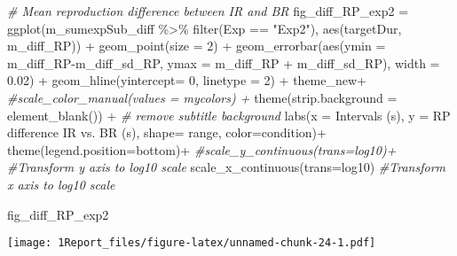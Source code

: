 \documentclass[
]{article}
\newenvironment{Shaded}{\begin{snugshade}}{\end{snugshade}}
\newcommand{\AttributeTok}[1]{\textcolor[rgb]{0.77,0.63,0.00}{#1}}
\newcommand{\CommentTok}[1]{\textcolor[rgb]{0.56,0.35,0.01}{\textit{#1}}}
\newcommand{\DecValTok}[1]{\textcolor[rgb]{0.00,0.00,0.81}{#1}}
\newcommand{\FloatTok}[1]{\textcolor[rgb]{0.00,0.00,0.81}{#1}}
\newcommand{\FunctionTok}[1]{\textcolor[rgb]{0.00,0.00,0.00}{#1}}
\newcommand{\NormalTok}[1]{#1}
\newcommand{\OtherTok}[1]{\textcolor[rgb]{0.56,0.35,0.01}{#1}}
\newcommand{\SpecialCharTok}[1]{\textcolor[rgb]{0.00,0.00,0.00}{#1}}
\newcommand{\StringTok}[1]{\textcolor[rgb]{0.31,0.60,0.02}{#1}}
\begin{document}
\begin{Shaded}
\begin{Highlighting}[]
\CommentTok{\# Mean reproduction difference between IR and BR}
\NormalTok{fig\_diff\_RP\_exp2 }\OtherTok{=} \FunctionTok{ggplot}\NormalTok{(m\_sumexpSub\_diff }\SpecialCharTok{\%\textgreater{}\%} \FunctionTok{filter}\NormalTok{(Exp }\SpecialCharTok{==} \StringTok{"Exp2"}\NormalTok{), }\FunctionTok{aes}\NormalTok{(targetDur, m\_diff\_RP)) }\SpecialCharTok{+} 
  \FunctionTok{geom\_point}\NormalTok{(}\AttributeTok{size =} \DecValTok{2}\NormalTok{) }\SpecialCharTok{+}
  \FunctionTok{geom\_errorbar}\NormalTok{(}\FunctionTok{aes}\NormalTok{(}\AttributeTok{ymin =}\NormalTok{ m\_diff\_RP}\SpecialCharTok{{-}}\NormalTok{m\_diff\_sd\_RP, }\AttributeTok{ymax =}\NormalTok{ m\_diff\_RP }\SpecialCharTok{+}\NormalTok{ m\_diff\_sd\_RP), }\AttributeTok{width =} \FloatTok{0.02}\NormalTok{) }\SpecialCharTok{+}
  \FunctionTok{geom\_hline}\NormalTok{(}\AttributeTok{yintercept=} \DecValTok{0}\NormalTok{, }\AttributeTok{linetype =} \DecValTok{2}\NormalTok{) }\SpecialCharTok{+}
\NormalTok{  theme\_new}\SpecialCharTok{+} \CommentTok{\#scale\_color\_manual(values = mycolors) +}
  \FunctionTok{theme}\NormalTok{(}\AttributeTok{strip.background =} \FunctionTok{element\_blank}\NormalTok{()) }\SpecialCharTok{+} \CommentTok{\# remove subtitle background}
  \FunctionTok{labs}\NormalTok{(}\AttributeTok{x =} \StringTok{\textquotesingle{}Intervals (s)\textquotesingle{}}\NormalTok{, }\AttributeTok{y =} \StringTok{\textquotesingle{}RP difference IR vs. BR (s)\textquotesingle{}}\NormalTok{, }\AttributeTok{shape=} \StringTok{\textquotesingle{}range\textquotesingle{}}\NormalTok{, }\AttributeTok{color=}\StringTok{\textquotesingle{}condition\textquotesingle{}}\NormalTok{)}\SpecialCharTok{+} 
  \FunctionTok{theme}\NormalTok{(}\AttributeTok{legend.position=}\StringTok{\textquotesingle{}bottom\textquotesingle{}}\NormalTok{)}\SpecialCharTok{+}
  \CommentTok{\#scale\_y\_continuous(trans=\textquotesingle{}log10\textquotesingle{})+ \#Transform y axis to log10 scale}
  \FunctionTok{scale\_x\_continuous}\NormalTok{(}\AttributeTok{trans=}\StringTok{\textquotesingle{}log10\textquotesingle{}}\NormalTok{) }\CommentTok{\#Transform x axis to log10 scale}

\NormalTok{fig\_diff\_RP\_exp2}
\end{Highlighting}
\end{Shaded}

\texttt{[image: 1Report\_files/figure-latex/unnamed-chunk-24-1.pdf]}
\end{document}
